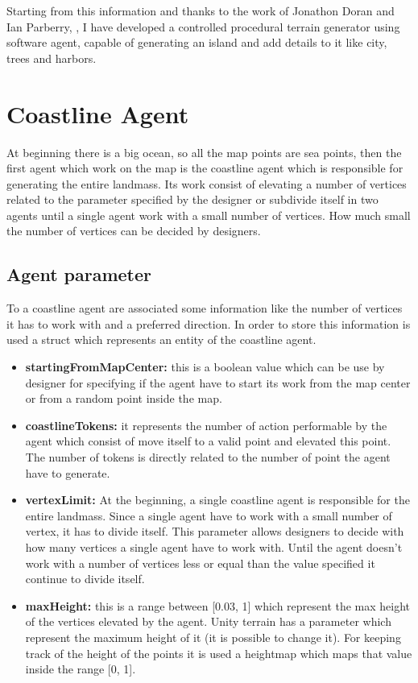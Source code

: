 \documentclass[12pt]{article}
\begin{document}
    Starting from this information and thanks to the work of Jonathon Doran and Ian Parberry, \cite{article}, I have developed a controlled procedural terrain generator using software 
    agent, capable of generating an island and add details to it like city, trees and harbors.

    \newpage

    \section{Coastline Agent}
    At beginning there is a big ocean, so all the map points are sea points, then the first agent which work on the map is the coastline agent which is responsible for 
    generating the entire landmass. Its work consist of elevating a number of vertices related to the parameter specified by the designer or subdivide itself in two agents
    until a single agent work with a small number of vertices. How much small the number of vertices can be decided by designers.

    \subsection{Agent parameter}
    To a coastline agent are associated some information like the number of vertices it has to work with and a preferred direction. In order to store this information is used
    a struct which represents an entity of the coastline agent. 

    \begin{itemize}
        \item \textbf{startingFromMapCenter:} this is a boolean value which can be use by designer for specifying if the agent have to start its work from the map center or
        from a random point inside the map.
        \item \textbf{coastlineTokens:} it represents the number of action performable by the agent which consist of move itself to a valid point and elevated this point. 
        The number of tokens is directly related to the number of point the agent have to generate.
        \item \textbf{vertexLimit:} At the beginning, a single coastline agent is responsible for the entire landmass. Since a single agent have to work with a small number
        of vertex, it has to divide itself. This parameter allows designers to decide with how many vertices a single agent have to work with. Until the agent doesn't
        work with a number of vertices less or equal than the value specified it continue to divide itself.
        \item \textbf{maxHeight:} this is a range between [0.03, 1] which represent the max height of the vertices elevated by the agent. Unity terrain has a parameter which 
        represent the maximum height of it (it is possible to change it). For keeping track of the height of the points it is used a heightmap which maps that value inside 
        the range [0, 1].
    \end{itemize}
\end{document}
